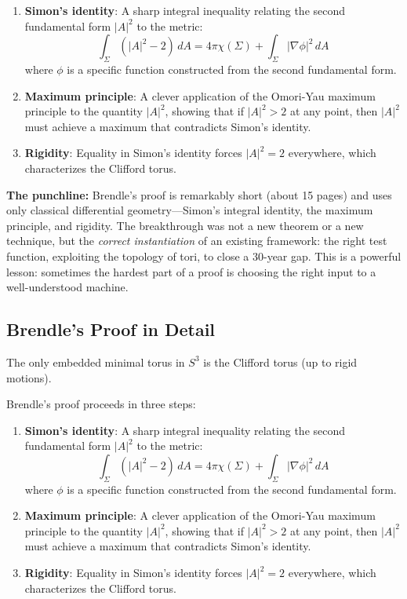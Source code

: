 \begin{enumerate}
\item \textbf{Simon's identity}: A sharp integral inequality relating the second fundamental form $|A|^2$ to the metric:
\[
\int_\Sigma \left( |A|^2 - 2 \right) \, dA = 4\pi \chi(\Sigma) + \int_\Sigma |\nabla \phi|^2 \, dA
\]
where $\phi$ is a specific function constructed from the second fundamental form.

\item \textbf{Maximum principle}: A clever application of the Omori-Yau maximum principle to the quantity $|A|^2$, showing that if $|A|^2 > 2$ at any point, then $|A|^2$ must achieve a maximum that contradicts Simon's identity.

\item \textbf{Rigidity}: Equality in Simon's identity forces $|A|^2 = 2$ everywhere, which characterizes the Clifford torus.
\end{enumerate}

\begin{highlightbox}
\textbf{The punchline:} Brendle's proof is remarkably short (about 15 pages) and uses only classical differential geometry---Simon's integral identity, the maximum principle, and rigidity. The breakthrough was not a new theorem or a new technique, but the \emph{correct instantiation} of an existing framework: the right test function, exploiting the topology of tori, to close a 30-year gap. This is a powerful lesson: sometimes the hardest part of a proof is choosing the right input to a well-understood machine.
\end{highlightbox}

\subsection{Brendle's Proof in Detail}

\begin{theorem}
The only embedded minimal torus in $S^3$ is the Clifford torus (up to rigid motions).
\end{theorem}

Brendle's proof proceeds in three steps:

\begin{enumerate}
\item \textbf{Simon's identity}: A sharp integral inequality relating the second fundamental form $|A|^2$ to the metric:
\[
\int_\Sigma \left( |A|^2 - 2 \right) \, dA = 4\pi \chi(\Sigma) + \int_\Sigma |\nabla \phi|^2 \, dA
\]
where $\phi$ is a specific function constructed from the second fundamental form.

\item \textbf{Maximum principle}: A clever application of the Omori-Yau maximum principle to the quantity $|A|^2$, showing that if $|A|^2 > 2$ at any point, then $|A|^2$ must achieve a maximum that contradicts Simon's identity.

\item \textbf{Rigidity}: Equality in Simon's identity forces $|A|^2 = 2$ everywhere, which characterizes the Clifford torus.
\end{enumerate}

